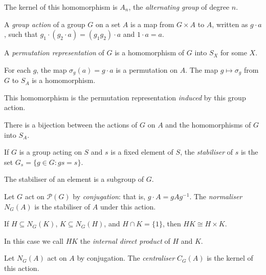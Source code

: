 \begin{defn}
    The kernel of this homomorphism is $A_n$, the \emph{alternating group} of
    degree $n$.
\end{defn}
\begin{defn}
    A \emph{group action} of a group $G$ on a set $A$ is a map from $G\times A$
    to $A$, written as $g\cdot a$, such that $g_1\cdot(g_2\cdot
    a)=(g_1g_2)\cdot a$ and $1\cdot a=a$.
\end{defn}
\begin{defn}
    A \emph{permutation representation} of $G$ is a homomorphism of $G$ into
    $S_X$ for some $X$.
\end{defn}
\begin{prop}
    For each $g$, the map $\sigma_g(a)=g\cdot a$ is a permutation on $A$.
    The map $g\mapsto\sigma_g$ from $G$ to $S_A$ is a homomorphism.
\end{prop}
\begin{defn}
    This homomorphism is the permutation representation \emph{induced} by this
    group action.
\end{defn}
\begin{prop}
    There is a bijection between the actions of $G$ on $A$ and the homomorphisms
    of $G$ into $S_A$.
\end{prop}
\begin{defn}
    If $G$ is a group acting on $S$ and $s$ is a fixed element of $S$, the
    \emph{stabiliser} of $s$ is the set $G_s=\{g\in G:gs=s\}$.
\end{defn}
\begin{prop}
    The stabiliser of an element is a subgroup of $G$.
\end{prop}
\begin{defn}
    Let $G$ act on $\mathcal P(G)$ by \emph{conjugation}: that is, $g\cdot
    A=gAg^{-1}$. The \emph{normaliser} $N_G(A)$ is the stabiliser of $A$ under
    this action.
\end{defn}
\begin{prop}
    If $H\subseteq N_G(K)$, $K\subseteq N_G(H)$, and $H\cap K=\{1\}$, then
    $HK\cong H\times K$.
\end{prop}
\begin{defn}
    In this case we call $HK$ the \emph{internal direct product} of $H$ and $K$.
\end{defn}
\begin{defn}
    Let $N_G(A)$ act on $A$ by conjugation. The \emph{centraliser} $C_G(A)$ is the
    kernel of this action.
\end{defn}

